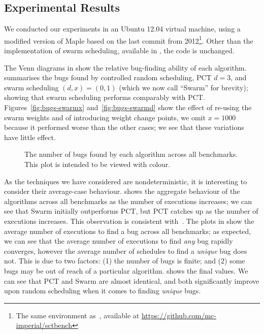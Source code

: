 \subsection{Experimental Results}
\label{sec:algorithms-eval-results}

We conducted our experiments in an Ubuntu 12.04 virtual machine, using a
modified version of Maple based on the last commit from 2012\footnote{The same
environment as~\cite{thomson2016}, available
at \url{https://github.com/mc-imperial/sctbench}}.  Other than the
implementation of swarm scheduling, available in , the code is
unchanged.

The Venn diagrams in  show the relative bug-finding ability of each
algorithm.   summarises the bugs found by controlled random
scheduling, PCT $d=3$, and swarm scheduling $(d,x)=(0,1)$ (which we now call
``Swarm'' for brevity); showing that swarm scheduling performs comparably with
PCT.  Figures~\ref{fig:bugs-swarmx} and~\ref{fig:bugs-swarmd} show the effect of
re-using the swarm weights and of introducing weight change points, we omit
$x=1000$ because it performed worse than the other cases; we see that these
variations have little effect.

\begin{figure}[t]
  \centering
  
  \caption{The number of bugs found by each algorithm across all benchmarks.  This plot is intended to be viewed with colour.}\label{fig:totalbugs}
\end{figure}

As the techniques we have considered are nondeterministic, it is interesting to
consider their average-case behaviour.   shows the aggregate
behaviour of the algorithms across all benchmarks as the number of executions
increases; we can see that Swarm initially outperforms PCT, but PCT catches up
as the number of executions increases.  This observation is consistent
with~\cite{thomson2016}.  The plots in  show the average number
of executions to find a bug across all benchmarks; as expected, we can see that
the average number of executions to find \emph{any} bug rapidly converges,
however the average number of schedules to find a \emph{unique} bug does not.
This is due to two factors: (1) the number of bugs is finite; and (2) some bugs
may be out of reach of a particular algorithm.   shows the final
values.  We can see that PCT and Swarm are almost identical, and both
significantly improve upon random scheduling when it comes to
finding \emph{unique} bugs.

